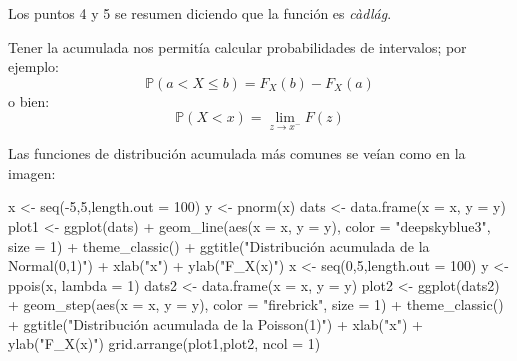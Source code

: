 \documentclass[
]{book}
\newenvironment{Shaded}{\begin{snugshade}}{\end{snugshade}}
\newcommand{\AttributeTok}[1]{\textcolor[rgb]{0.77,0.63,0.00}{#1}}
\newcommand{\DecValTok}[1]{\textcolor[rgb]{0.00,0.00,0.81}{#1}}
\newcommand{\FunctionTok}[1]{\textcolor[rgb]{0.00,0.00,0.00}{#1}}
\newcommand{\NormalTok}[1]{#1}
\newcommand{\OtherTok}[1]{\textcolor[rgb]{0.56,0.35,0.01}{#1}}
\newcommand{\SpecialCharTok}[1]{\textcolor[rgb]{0.00,0.00,0.00}{#1}}
\newcommand{\StringTok}[1]{\textcolor[rgb]{0.31,0.60,0.02}{#1}}
\begin{document}
Los puntos 4 y 5 se resumen diciendo que la función es \emph{càdlág}.

Tener la acumulada nos permitía calcular probabilidades de intervalos; por ejemplo:
\[
\mathbb{P}(a < X \leq b) = F_X(b) - F_X(a)
\]
o bien:
\[
\mathbb{P}(X < x) = \lim_{z \to x^-} F(z)
\]

Las funciones de distribución acumulada más comunes se veían como en la imagen:

\begin{Shaded}
\begin{Highlighting}[]
\NormalTok{x }\OtherTok{\textless{}{-}} \FunctionTok{seq}\NormalTok{(}\SpecialCharTok{{-}}\DecValTok{5}\NormalTok{,}\DecValTok{5}\NormalTok{,}\AttributeTok{length.out =} \DecValTok{100}\NormalTok{)}
\NormalTok{y }\OtherTok{\textless{}{-}} \FunctionTok{pnorm}\NormalTok{(x)}
\NormalTok{dats }\OtherTok{\textless{}{-}} \FunctionTok{data.frame}\NormalTok{(}\AttributeTok{x =}\NormalTok{ x, }\AttributeTok{y =}\NormalTok{ y)}
\NormalTok{plot1 }\OtherTok{\textless{}{-}} \FunctionTok{ggplot}\NormalTok{(dats) }\SpecialCharTok{+} \FunctionTok{geom\_line}\NormalTok{(}\FunctionTok{aes}\NormalTok{(}\AttributeTok{x =}\NormalTok{ x, }\AttributeTok{y =}\NormalTok{ y), }\AttributeTok{color =} \StringTok{"deepskyblue3"}\NormalTok{, }\AttributeTok{size =} \DecValTok{1}\NormalTok{) }\SpecialCharTok{+} \FunctionTok{theme\_classic}\NormalTok{() }\SpecialCharTok{+} \FunctionTok{ggtitle}\NormalTok{(}\StringTok{"Distribución acumulada de la Normal(0,1)"}\NormalTok{) }\SpecialCharTok{+}
  \FunctionTok{xlab}\NormalTok{(}\StringTok{"x"}\NormalTok{) }\SpecialCharTok{+} \FunctionTok{ylab}\NormalTok{(}\StringTok{"F\_X(x)"}\NormalTok{)}
\NormalTok{x }\OtherTok{\textless{}{-}} \FunctionTok{seq}\NormalTok{(}\DecValTok{0}\NormalTok{,}\DecValTok{5}\NormalTok{,}\AttributeTok{length.out =} \DecValTok{100}\NormalTok{)}
\NormalTok{y }\OtherTok{\textless{}{-}} \FunctionTok{ppois}\NormalTok{(x, }\AttributeTok{lambda =} \DecValTok{1}\NormalTok{)}
\NormalTok{dats2 }\OtherTok{\textless{}{-}} \FunctionTok{data.frame}\NormalTok{(}\AttributeTok{x =}\NormalTok{ x, }\AttributeTok{y =}\NormalTok{ y)}
\NormalTok{plot2 }\OtherTok{\textless{}{-}} \FunctionTok{ggplot}\NormalTok{(dats2) }\SpecialCharTok{+} \FunctionTok{geom\_step}\NormalTok{(}\FunctionTok{aes}\NormalTok{(}\AttributeTok{x =}\NormalTok{ x, }\AttributeTok{y =}\NormalTok{ y), }\AttributeTok{color =} \StringTok{"firebrick"}\NormalTok{, }\AttributeTok{size =} \DecValTok{1}\NormalTok{) }\SpecialCharTok{+} \FunctionTok{theme\_classic}\NormalTok{() }\SpecialCharTok{+} \FunctionTok{ggtitle}\NormalTok{(}\StringTok{"Distribución acumulada de la Poisson(1)"}\NormalTok{) }\SpecialCharTok{+}
  \FunctionTok{xlab}\NormalTok{(}\StringTok{"x"}\NormalTok{) }\SpecialCharTok{+} \FunctionTok{ylab}\NormalTok{(}\StringTok{"F\_X(x)"}\NormalTok{)}
\FunctionTok{grid.arrange}\NormalTok{(plot1,plot2, }\AttributeTok{ncol =} \DecValTok{1}\NormalTok{)}
\end{Highlighting}
\end{Shaded}
\end{document}
